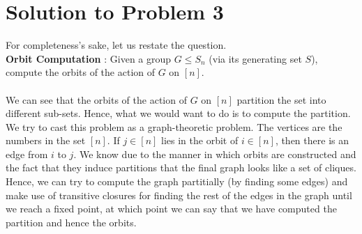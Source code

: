 \section{Solution to Problem 3}
For completeness's sake, let us restate the question.\\
{\bf Orbit Computation} : Given a group $G \le S_{n}$ (via its generating set $S$), compute the orbits of the action of $G$ on $[n]$.\\\\
We can see that the orbits of the action of $G$ on $[n]$ partition the set into different sub-sets. Hence, what we would want to do is to compute the partition. We try to cast this problem as a graph-theoretic problem.
The vertices are the numbers in the set $[n]$.
If $j \in [n]$ lies in the orbit of $i \in [n]$, then there is an edge from $i$ to $j$. We know due to the manner in which orbits are constructed and the fact that they induce partitions that the final graph looks like a set of cliques. Hence, we can try to compute the graph partitially (by finding some edges) and make use of transitive closures for finding the rest of the edges in the graph until we reach a fixed point, at which point we can say that we have computed the partition and hence the orbits.  

